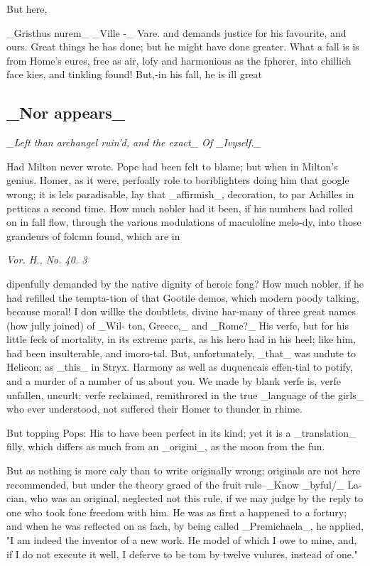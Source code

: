 But here,\par\medskip
\_Gristhus nurem\_ \_Ville -\_ Vare. and demands justice for his favourite, and ours. Great things he has done; but he might have done greater. What a fall is is from Home’s eures, free as air, lofy and harmonious as the fpherer, into chillich face kies, and tinkling found! But,-in his fall, he is ill great\par\medskip
\subsection*{\_Nor appears\_}
{\small\itshape \_Left than archangel ruin'd, and the exact\_ Of \_Ivyself.\_\par}\medskip
Had Milton never wrote. Pope had been felt to blame; but when in Milton’s genius. Homer, as it were, perfoally role to boriblighters doing him that google wrong; it is lels paradisable, lay that \_affirmish\_, decoration, to par Achilles in petticas a second time. How much nobler had it been, if his numbers had rolled on in fall flow, through the various modulations of maculoline melo-dy, into those grandeurs of folcmn found, which are in\par\medskip
{\small\itshape Vor. H., No. 40. 3\par}\medskip
dipenfully demanded by the native dignity of heroic fong? How much nobler, if he had refilled the tempta-tion of that Gootile demos, which modern poody talking, because moral! I don willke the doubtlets, divine har-many of three great names (how jully joined) of \_Wil- ton, Greece,\_ and \_Rome?\_ His verfe, but for his little feck of mortality, in its extreme parts, as his hero had in his heel; like him, had been insulterable, and imoro-tal. But, unfortunately, \_that\_ was undute to Helicon; as \_this\_ in Stryx. Harmony as well as duquencais effen-tial to potify, and a murder of a number of us about you. We made by blank verfe is, verfe unfallen, uncurlt; verfe reclaimed, remithrored in the true \_language of the girls\_ who ever understood, not suffered their Homer to thunder in rhime.\par\medskip
But topping Pops: His to have been perfect in its kind; yet it is a \_translation\_ filly, which differs as much from an \_origini\_, as the moon from the fun.\par\medskip
But as nothing is more caly than to write originally wrong; originals are not here recommended, but under the theory graed of the fruit rule--\_Know \_byful/\_ La- cian, who was an original, neglected not this rule, if we may judge by the reply to one who took fone freedom with him. He was as first a happened to a fortury; and when he was reflected on as fach, by being called \_Premichaela\_, he applied, "I am indeed the inventor of a new work. He model of which I owe to mine, and, if I do not execute it well, I deferve to be tom by twelve vulures, instead of one."\par\medskip
